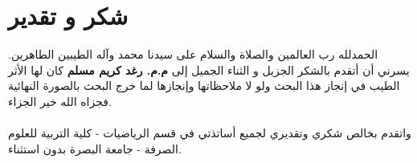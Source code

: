 \chapter*{شكر و تقدير}

الحمدلله رب العالمين والصلاة والسلام على سيدنا محمد وآله الطيبين الطاهرين. يسرني أن أتقدم بالشكر الجزيل و الثناء الجميل إلى \textbf{م.م. رغد كريم مسلم} كان لها الأثر الطيب في إنجاز هذا البحث ولو لا ملاحظاتها وإنجازها لما خرج البحث بالصورة النهائية فجزاه الله خير الجزاء.\\
\\
واتقدم بخالص شكري وتقديري لجميع أساتذتي في قسم الرياضيات - كلية التربية للعلوم الصرفة - جامعة البصرة بدون استثناء.
